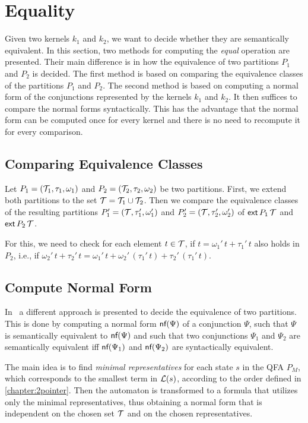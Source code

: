 \section{Equality}

Given two kernels $k_1$ and $k_2$, we want to decide whether they are semantically equivalent.
In this section, two methods for computing the \emph{equal} operation are presented.
Their main difference is in how the equivalence of two partitions $P_1$ and $P_2$ is decided.
The first method is based on comparing the equivalence classes of the partitions $P_1$ and $P_2$.
The second method is based on computing a normal form of the conjunctions represented by the kernels $k_1$ and $k_2$.
It then suffices to compare the normal forms syntactically. This has the advantage that the normal form can be computed once
for every kernel and there is no need to recompute it for every comparison.

\subsection{Comparing Equivalence Classes}

Let $P_1 = (\mathcal{T}_1, \tau_1, \omega_1)$ and $P_2 = (\mathcal{T}_2, \tau_2, \omega_2)$ be two partitions.
First, we extend both partitions to the set $\mathcal{T} = \mathcal{T}_1 \cup \mathcal{T}_2$.
Then we compare the equivalence classes of the resulting partitions $P_1' = (\mathcal{T}, \tau_1', \omega_1')$ and $P_2' = (\mathcal{T}, \tau_2', \omega_2')$ of $\textsf{ext}\,{P_1}\,{\mathcal{T}}$ and $\textsf{ext}\,{P_2}\,{\mathcal{T}}$.

For this, we need to check for each element $t \in \mathcal{T}$, if $t = \omega_1'\,t + \tau_1'\,t$ also holds in $P_2$, i.e.,
if $\omega_2'\,t + \tau_2'\,t = \omega_1'\,t + \omega_2'\,(\tau_1'\,t) + \tau_2'\,(\tau_1'\,t)$.

\subsection{Compute Normal Form}

In~\cite{2pointer} a different approach is presented to decide the equivalence of two partitions.
This is done by computing a normal form $\textsf{nf}(\Psi)$ of a conjunction $\Psi$, such that $\Psi$ is semantically equivalent to $\textsf{nf}(\Psi)$ and such that two conjunctions $\Psi_1$ and $\Psi_2$ are semantically equivalent iff $\textsf{nf}(\Psi_1)$ and $\textsf{nf}(\Psi_2)$ are syntactically equivalent.

The main idea is to find \emph{minimal representatives} for each state $s$ in the QFA $P_M$,
which corresponds to the smallest term in $\mathcal{L}(s)$, according to the order defined in \cref{chapter:2pointer}.
Then the automaton is transformed to a formula that utilizes only the minimal representatives, thus obtaining a normal form
that is independent on the chosen set $\mathcal{T}$ and on the chosen representatives.

